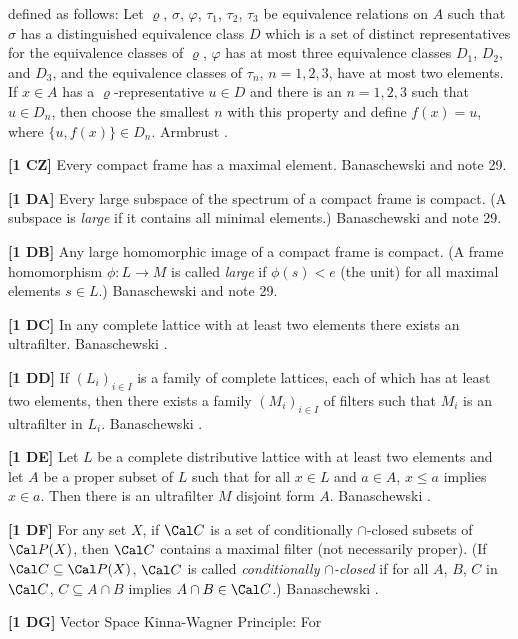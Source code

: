 defined as follows: Let $\varrho$, $\sigma$, $\varphi$, $\tau_1$,
$\tau_2$, $\tau_3$ be equivalence relations on $A$ such that $\sigma$
has a distinguished equivalence class $D$ which is a set of distinct
representatives for the equivalence classes of $\varrho$, $\varphi$
has at most three equivalence classes $D_1$, $D_2$, and $D_3$, and
the equivalence classes of $\tau_n$, $n=1,2,3$, have at most two
elements. If $x\in A$ has a $\varrho$-representative $u\in D$ and
there is an $n=1,2,3$ such that $u\in D_n$, then choose the smallest $n$
with this property and define $f(x)=u$, where $\{u,f(x)\}\in D_n$.
\ac{Armbrust} \cite{1986}.
\smallskip
\item{}{\bf [1 CZ]} Every compact frame has a maximal element.
\ac{Banaschewski} \cite{1990} and note 29.
\smallskip
\item{}{\bf [1 DA]} Every large subspace of the spectrum of a
compact frame is compact. (A subspace is {\it large} if it contains
all minimal elements.) \ac{Banaschewski} \cite{1990} and note 29.
\smallskip
\item{}{\bf [1 DB]} Any large homomorphic image of a compact frame
is compact.  (A frame homomorphism $\phi: L\to M$ is called
{\it large} if $\phi(s) < e$ (the unit) for all maximal elements
$s\in L$.) \ac{Banaschewski} \cite{1990} and note 29.
\smallskip
\item{}{\bf [1 DC]} In any complete lattice with at least two elements
there exists an ultrafilter. \ac{Banaschewski} \cite{1961}.
\smallskip
\item{}{\bf [1 DD]} If $(L_i)_{i\in I}$ is a family of complete
lattices, each of which has at least two elements, then there exists
a family $(M_i)_{i\in I}$ of filters such that $M_i$ is an
ultrafilter in $L_i$.  \ac{Banaschewski} \cite{1961}.
\smallskip
\item{}{\bf [1 DE]} Let $L$ be a complete distributive lattice with
at least two elements and let $A$ be a proper subset of $L$ such that
for all $x\in L$ and $a\in A$, $x\le a$ implies $x\in a$. Then there
is an ultrafilter $M$ disjoint form $A$. \ac{Banaschewski} \cite{1961}.
\smallskip
\item{}{\bf [1 DF]} For any set $X$, if $\Cal C$ is a set of
conditionally $\cap$-closed subsets of $\Cal P(X)$, then $\Cal C$
contains a maximal filter (not necessarily proper). (If $\Cal C\subseteq
\Cal P(X)$, $\Cal C$ is called {\it conditionally $\cap$-closed} if for
all $A$, $B$, $C$ in $\Cal C$, $C\subseteq A\cap B$ implies $A\cap B\in
\Cal C$.) \ac{Banaschewski} \cite{1961}.
\smallskip
\item{}{\bf [1 DG]} Vector Space Kinna-Wagner Principle:  For
